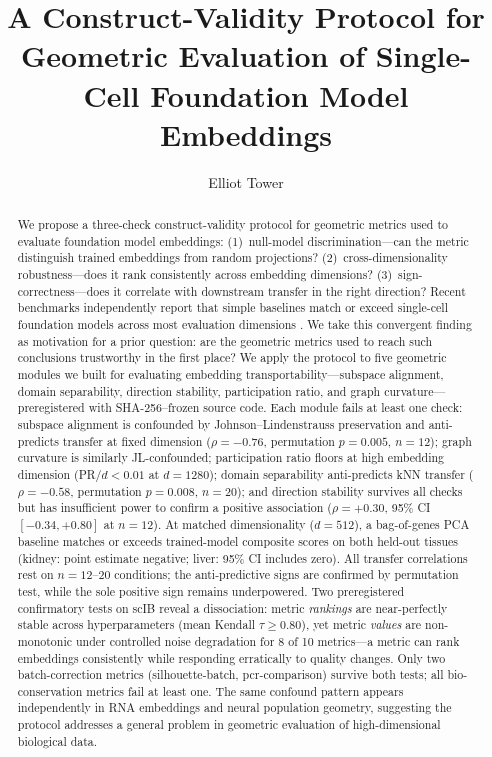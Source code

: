 \documentclass[10pt,letterpaper]{article}
\title{A Construct-Validity Protocol for Geometric Evaluation of Single-Cell Foundation Model Embeddings}
\author[1]{Elliot Tower}
\affil[1]{Independent Researcher}
\begin{document}
\maketitle

\begin{abstract}
We propose a three-check construct-validity protocol for geometric metrics used to evaluate foundation model embeddings: (1)~null-model discrimination---can the metric distinguish trained embeddings from random projections? (2)~cross-dimensionality robustness---does it rank consistently across embedding dimensions? (3)~sign-correctness---does it correlate with downstream transfer in the right direction? Recent benchmarks independently report that simple baselines match or exceed single-cell foundation models across most evaluation dimensions \citep{vcbench2026, unifiedscfm2026, cellxgeneintegration2026}. We take this convergent finding as motivation for a prior question: are the geometric metrics used to reach such conclusions trustworthy in the first place? We apply the protocol to five geometric modules we built for evaluating embedding transportability---subspace alignment, domain separability, direction stability, participation ratio, and graph curvature---preregistered with SHA-256--frozen source code. Each module fails at least one check: subspace alignment is confounded by Johnson--Lindenstrauss preservation and anti-predicts transfer at fixed dimension ($\rho = -0.76$, permutation $p = 0.005$, $n = 12$); graph curvature is similarly JL-confounded; participation ratio floors at high embedding dimension (PR$/d < 0.01$ at $d = 1280$); domain separability anti-predicts kNN transfer ($\rho = -0.58$, permutation $p = 0.008$, $n = 20$); and direction stability survives all checks but has insufficient power to confirm a positive association ($\rho = +0.30$, 95\% CI $[-0.34, +0.80]$ at $n = 12$). At matched dimensionality ($d = 512$), a bag-of-genes PCA baseline matches or exceeds trained-model composite scores on both held-out tissues (kidney: point estimate negative; liver: 95\% CI includes zero). All transfer correlations rest on $n = 12$--$20$ conditions; the anti-predictive signs are confirmed by permutation test, while the sole positive sign remains underpowered. Two preregistered confirmatory tests on scIB reveal a dissociation: metric \emph{rankings} are near-perfectly stable across hyperparameters (mean Kendall $\tau \geq 0.80$), yet metric \emph{values} are non-monotonic under controlled noise degradation for 8 of 10 metrics---a metric can rank embeddings consistently while responding erratically to quality changes. Only two batch-correction metrics (silhouette-batch, pcr-comparison) survive both tests; all bio-conservation metrics fail at least one. The same confound pattern appears independently in RNA embeddings and neural population geometry, suggesting the protocol addresses a general problem in geometric evaluation of high-dimensional biological data.
\end{abstract}
\end{document}
